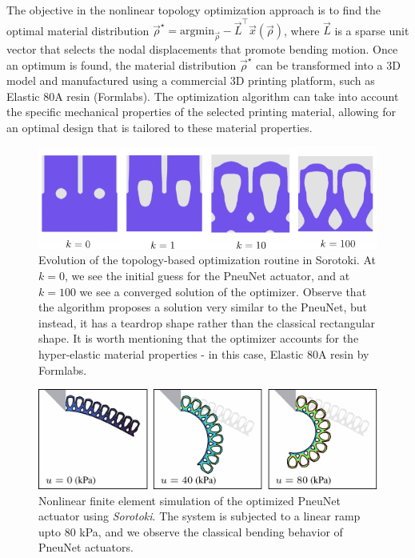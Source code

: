 The objective in the nonlinear topology optimization approach is to find the optimal material distribution $\vec{\rho}^\star = \textrm{argmin}_{\vec{\rho}}  -\vec{L}^\top \vec{x}(\vec{\rho})$, where $\vec{L}$ is a sparse unit vector that selects the nodal displacements that promote bending motion. Once an optimum is found, the material distribution $\vec{\rho}^\star$ can be transformed into a 3D model and manufactured using a commercial 3D printing platform, such as Elastic 80A resin (Formlabs). The optimization algorithm can take into account the specific mechanical properties of the selected printing material, allowing for an optimal design that is tailored to these material properties.
%
\begin{figure}[!t]
    \vspace{-2mm}
    \centering
    \includegraphics*[width=.95\textwidth]{./pdf/thesis-figure-6-22.pdf}
    \caption{Evolution of the topology-based optimization routine in Sorotoki. At $k=0$, we see the initial guess for the PneuNet actuator, and at $k=100$ we see a converged solution of the optimizer. Observe that the algorithm proposes a solution very similar to the PneuNet, but instead, it has a teardrop shape rather than the classical rectangular shape. It is worth mentioning that the optimizer accounts for the hyper-elastic material properties - in this case, Elastic 80A resin by Formlabs.}
    \label{fig:C5:fig_optpneunet_solutions}
    \vspace{-3mm}
\end{figure}

\begin{figure}[!t]
    \centering
    \includegraphics*[width=.95\textwidth]{./pdf/thesis-figure-6-23.pdf}
    \caption{Nonlinear finite element simulation of the optimized PneuNet actuator using \textit{Sorotoki}. The system is subjected to a linear ramp upto 80 \si{\kilo \pascal}, and we observe the classical bending behavior of PneuNet actuators. }
    \label{fig:C5:fig_optpneunet_fem}
    \vspace{-3mm}
\end{figure}
%

